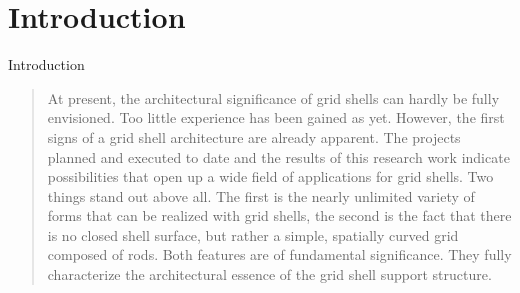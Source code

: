 
\chapter{Introduction}\label{chp:intro}
Introduction

\blockcquote[][p.~250]{IL10}{At present, the architectural significance of grid shells can hardly be fully envisioned. Too little experience has been gained as yet. However, the first signs of a grid shell architecture are already apparent. The projects planned and executed to date and the results of this research work indicate possibilities that open up a wide field of applications for grid shells. Two things stand out above all. The first is the nearly unlimited variety of forms that can be realized with grid shells, the second is the fact that there is no closed shell surface, but rather a simple, spatially curved grid composed of rods. Both features are of fundamental significance. They fully characterize the architectural essence of the grid shell support structure.}


